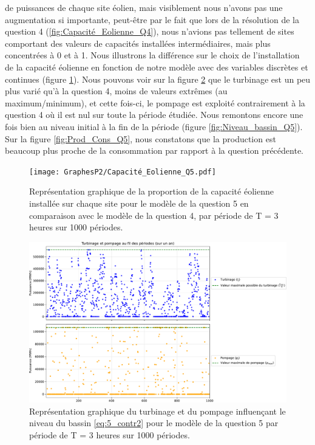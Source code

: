 \documentclass{article}
\begin{document}
de puissances de chaque site éolien, mais visiblement nous n'avons pas une augmentation si importante, peut-être par le fait 
que lors de la résolution de la question 4 (\autoref{fig:Capacité_Eolienne_Q4}), nous n'avions pas tellement de sites
comportant des valeurs de capacités installées intermédiaires, mais plus concentrées à 0 et à 1. Nous illustrons la différence sur le choix de l'installation 
de la capacité éolienne en fonction de notre modèle avec des variables discrètes et continues (figure \ref{fig:Capacité_Eolienne_Q5}). Nous pouvons voir sur la figure \ref{fig:Turbinage_pompage_Q5} que le turbinage est un peu plus varié qu'à la question 4, moins de valeurs extrêmes (au maximum/minimum), et cette fois-ci,
le pompage est exploité contrairement à la question 4 où il est nul sur toute la période étudiée. 
Nous remontons encore une fois bien au niveau initial à la fin de la période (figure \ref{fig:Niveau_bassin_Q5}).  
Sur la figure \ref{fig:Prod_Cons_Q5}, nous constatons que la production est beaucoup plus proche de la consommation par rapport à la question précédente.
\begin{figure}[h!]
    \centering
    \texttt{[image: GraphesP2/Capacité\_Eolienne\_Q5.pdf]}
    \caption{Représentation graphique de la proportion de la capacité éolienne installée sur chaque site pour le modèle de la question 5 en comparaison
    avec le modèle de la question 4, par période
    de T = 3 heures sur 1000 périodes.}
    \label{fig:Capacité_Eolienne_Q5}
\end{figure}

\begin{figure}[H]
    \centering
    \includegraphics[scale=0.5]{GraphesP2/Turbinage_pompage_Q5.pdf}
    \caption{Représentation graphique du turbinage et du pompage
    influençant le niveau du bassin \eqref{eq:5_contr2} pour le modèle de la question 5 par période de T = 3 heures sur 1000 périodes.}
    \label{fig:Turbinage_pompage_Q5}
\end{figure}
\end{document}
